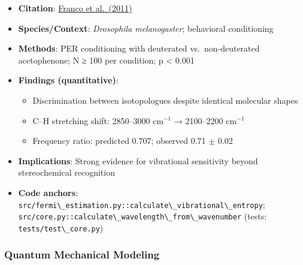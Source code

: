 \documentclass[
  13pt,
  a4paperpaper,
  12pt]{article}
\newcommand{\passthrough}[1]{#1}
\providecommand{\tightlist}{%
  \setlength{\itemsep}{0pt}\setlength{\parskip}{0pt}}
\begin{document}
\begin{itemize}
\tightlist
\item
  \textbf{Citation}:
  \href{https://www.pnas.org/doi/10.1073/pnas.1012293108}{Franco et
  al.~(2011)}
\item
  \textbf{Species/Context}: \emph{Drosophila melanogaster}; behavioral
  conditioning
\item
  \textbf{Methods}: PER conditioning with deuterated vs.~non‑deuterated
  acetophenone; N ≥ 100 per condition; p \textless{} 0.001
\item
  \textbf{Findings (quantitative)}:

  \begin{itemize}
  \tightlist
  \item
    Discrimination between isotopologues despite identical molecular
    shapes
  \item
    C--H stretching shift: 2850--3000 cm\(^{-1}\) → 2100--2200
    cm\(^{-1}\)
  \item
    Frequency ratio: predicted 0.707; observed 0.71 \(\pm\) 0.02
  \end{itemize}
\item
  \textbf{Implications}: Strong evidence for vibrational sensitivity
  beyond stereochemical recognition
\item
  \textbf{Code anchors}:
  \passthrough{\lstinline!src/fermi\_estimation.py::calculate\_vibrational\_entropy!};
  \passthrough{\lstinline!src/core.py::calculate\_wavelength\_from\_wavenumber!}
  (tests: \passthrough{\lstinline!tests/test\_core.py!})
\end{itemize}

\subsubsection{Quantum Mechanical
Modeling}\label{quantum-mechanical-modeling}
\end{document}
